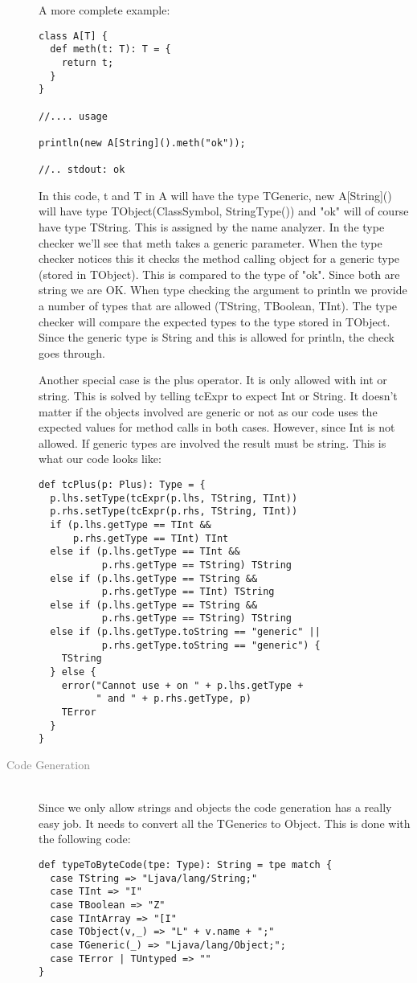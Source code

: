 \begin{description}
A more complete example:

\begin{lstlisting}
class A[T] {
  def meth(t: T): T = {
    return t;
  }
}

//.... usage

println(new A[String]().meth("ok"));

//.. stdout: ok
\end{lstlisting}

In this code, t and T in A will have the type TGeneric, new A[String]() will have type TObject(ClassSymbol, StringType()) and "ok" will of course have type TString. This is assigned by the name analyzer. In the type checker we'll see that meth takes a generic parameter. When the type checker notices this it checks the method calling object for a generic type (stored in TObject). This is compared to the type of "ok". Since both are string we are OK. When type checking the argument to println we provide a number of types that are allowed (TString, TBoolean, TInt). The type checker will compare the expected types to the type stored in TObject. Since the generic type is String and this is allowed for println, the check goes through.

Another special case is the plus operator. It is only allowed with int or string. This is solved by telling tcExpr to expect Int or String. It doesn't matter if the objects involved are generic or not as our code uses the expected values for method calls in both cases. However, since Int is not allowed. If generic types are involved the result must be string. This is what our code looks like:

\begin{lstlisting}
def tcPlus(p: Plus): Type = {
  p.lhs.setType(tcExpr(p.lhs, TString, TInt))
  p.rhs.setType(tcExpr(p.rhs, TString, TInt))
  if (p.lhs.getType == TInt &&
      p.rhs.getType == TInt) TInt
  else if (p.lhs.getType == TInt &&
           p.rhs.getType == TString) TString
  else if (p.lhs.getType == TString &&
           p.rhs.getType == TInt) TString
  else if (p.lhs.getType == TString &&
           p.rhs.getType == TString) TString
  else if (p.lhs.getType.toString == "generic" ||
           p.rhs.getType.toString == "generic") {
    TString
  } else {
    error("Cannot use + on " + p.lhs.getType +
          " and " + p.rhs.getType, p)
    TError
  }
}
\end{lstlisting}

\item[\textcolor{Gray}{Code Generation}] \hfill \\
Since we only allow strings and objects the code generation has a really easy job. It needs to convert all the TGenerics to Object. This is done with the following code:

\begin{lstlisting}
def typeToByteCode(tpe: Type): String = tpe match {
  case TString => "Ljava/lang/String;"
  case TInt => "I"
  case TBoolean => "Z"
  case TIntArray => "[I"
  case TObject(v,_) => "L" + v.name + ";"
  case TGeneric(_) => "Ljava/lang/Object;";
  case TError | TUntyped => ""
}
\end{lstlisting}

\end{description}
